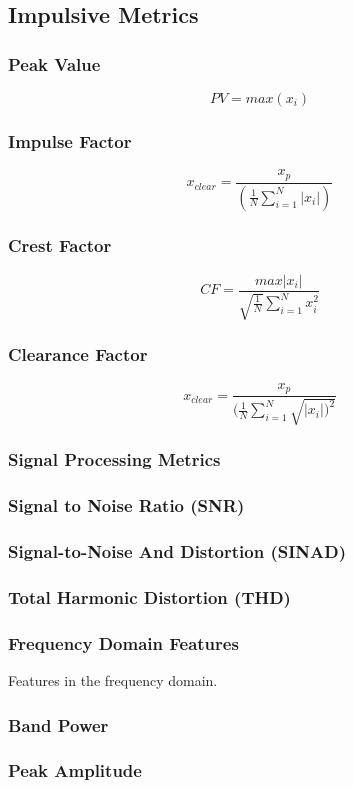 \documentclass{article}
\begin{document}
\subsection{Impulsive Metrics}  
\subsubsection{Peak Value}
$$ PV = max(x_i) $$ 
\subsubsection{Impulse Factor} 
$$ x_{clear} = \frac{x_p}{(\frac{1}{N}\sum^N_{i=1}|x_i|)} $$  
\subsubsection{Crest Factor} 
$$ CF = \frac{max|x_i|}{\sqrt{\frac{1}{N}}\sum^N_{i=1}x^2_i} $$
\subsubsection{Clearance Factor} 
$$ x_{clear} = \frac{x_p}{(\frac{1}{N}\sum^N_{i=1}\sqrt{|x_i|)^2}} $$
  
\subsubsection{Signal Processing Metrics}
\subsubsection{Signal to Noise Ratio (SNR)} 
\subsubsection{Signal-to-Noise And Distortion (SINAD)} 
\subsubsection{Total Harmonic Distortion (THD)}   

\subsubsection{Frequency Domain Features}
Features in the frequency domain.
\subsubsection{Band Power}
\subsubsection{Peak Amplitude}
\end{document}
